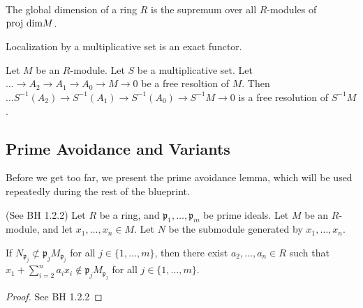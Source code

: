 \begin{definition}
  \label{def:globdim}
  The global dimension of a ring $R$
  is the supremum over all $R$-modules
  of $\text{proj dim} M$.
\end{definition}


\begin{lemma}
  \label{lem:loczn_exact}
  Localization by a multiplicative set is an exact functor.
\end{lemma}

\begin{lemma}
  \label{lem:loczn_of_resl_is_resl}
  Let $M$ be an $R$-module.
  Let $S$ be a multiplicative set.
  Let $\ldots \to A_2 \to A_1 \to A_0 \to M \to 0$
  be a free resoltion of $M$.
  Then
  $\ldots S^{-1}(A_2) \to S^{-1}(A_1) \to S^{-1}(A_0) \to S^{-1}M \to 0$
  is a free resolution of $S^{-1}M$.
\end{lemma}



\subsection{Prime Avoidance and Variants}

Before we get too far, we present the prime avoidance lemma, which will be used
repeatedly during the rest of the blueprint.

\begin{lemma}
    \label{lem:prime_avoidance}
    (See BH 1.2.2)
    Let \(R\) be a ring, and \(\mathfrak{p}_{1}, \ldots, \mathfrak{p}_{m}\)
    be prime ideals.
    Let \(M\) be an \(R\)-module, and let \(x_{1}, \ldots, x_{n} \in M\).
    Let \(N\) be the submodule generated by \(x_{1}, \ldots, x_{n}\).

    If \(N_{\mathfrak{p}_{j}} \not\subset \mathfrak{p}_{j}M_{\mathfrak{p}_{j}}\) for
    all \(j \in \{1, \ldots, m\}\), then there exist
    \(a_{2}, \ldots, a_{n} \in R\) such that
    \(x_{1} + \sum_{i=2}^{n} a_{i}x_{i} \not\in \mathfrak{p}_{j} M_{\mathfrak{p}_{j}} \)
    for all \(j \in \{1, \ldots, m\}\).
\end{lemma}

\begin{proof}
    See BH 1.2.2
\end{proof}

